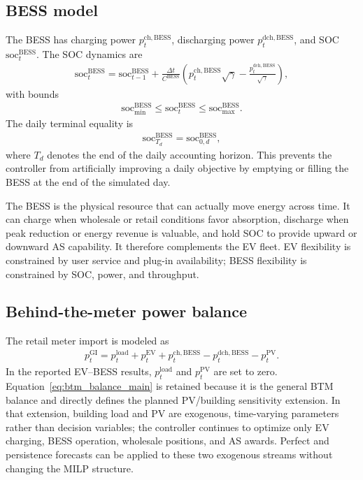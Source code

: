 \documentclass[final,5p,times]{elsarticle}
\newcommand{\DeltaT}{\Delta t}
\newcommand{\EV}{\mathrm{EV}}
\newcommand{\BESS}{\mathrm{BESS}}
\newcommand{\GI}{\mathrm{GI}}
\newcommand{\PV}{\mathrm{PV}}
\newcommand{\load}{\mathrm{load}}
\newcommand{\soc}{\mathrm{soc}}
\newcommand{\ch}{\mathrm{ch}}
\newcommand{\dch}{\mathrm{dch}}
\begin{document}
\subsection{BESS model}
The BESS has charging power $p_t^{\ch,\BESS}$, discharging power $p_t^{\dch,\BESS}$, and SOC $\soc_t^{\BESS}$. The SOC dynamics are
\begin{align}
\soc_t^{\BESS}=\soc_{t-1}^{\BESS}+\frac{\DeltaT}{C^{\BESS}}
\left(p_t^{\ch,\BESS}\sqrt{\gamma}-\frac{p_t^{\dch,\BESS}}{\sqrt{\gamma}}\right),
\label{eq:bess_soc_main}
\end{align}
with bounds
\begin{align}
\soc_{\min}^{\BESS}\le \soc_t^{\BESS}\le \soc_{\max}^{\BESS}.
\label{eq:bess_soc_bound_main}
\end{align}
The daily terminal equality is
\begin{align}
\soc_{T_d}^{\BESS}=\soc_{0,d}^{\BESS},
\label{eq:bess_terminal_main}
\end{align}
where $T_d$ denotes the end of the daily accounting horizon. This prevents the controller from artificially improving a daily objective by emptying or filling the BESS at the end of the simulated day.

The BESS is the physical resource that can actually move energy across time. It can charge when wholesale or retail conditions favor absorption, discharge when peak reduction or energy revenue is valuable, and hold SOC to provide upward or downward AS capability. It therefore complements the EV fleet. EV flexibility is constrained by user service and plug-in availability; BESS flexibility is constrained by SOC, power, and throughput.

\subsection{Behind-the-meter power balance}
The retail meter import is modeled as
\begin{align}
p_t^{\GI}=p_t^{\load}+p_t^{\EV}+p_t^{\ch,\BESS}-p_t^{\dch,\BESS}-p_t^{\PV}.
\label{eq:btm_balance_main}
\end{align}
In the reported EV--BESS results, $p_t^{\load}$ and $p_t^{\PV}$ are set to zero. Equation~\eqref{eq:btm_balance_main} is retained because it is the general BTM balance and directly defines the planned PV/building sensitivity extension. In that extension, building load and PV are exogenous, time-varying parameters rather than decision variables; the controller continues to optimize only EV charging, BESS operation, wholesale positions, and AS awards. Perfect and persistence forecasts can be applied to these two exogenous streams without changing the MILP structure.
\end{document}
